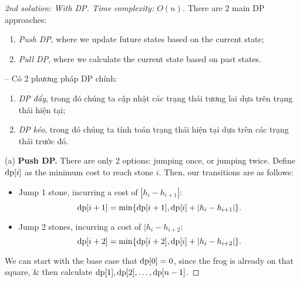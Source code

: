 \documentclass{article}
\begin{document}
\begin{proof}[2nd solution: With DP. Time complexity: $O(n)$]
    There are 2 main DP approaches:
    \begin{enumerate}
        \item {\it Push DP}, where we update future states based on the current state;
        \item {\it Pull DP}, where we calculate the current state based on past states.
    \end{enumerate}
    -- Có 2 phương pháp DP chính:
    \begin{enumerate}
        \item {\it DP đẩy}, trong đó chúng ta cập nhật các trạng thái tương lai dựa trên trạng thái hiện tại;
        \item {\it DP kéo}, trong đó chúng ta tính toán trạng thái hiện tại dựa trên các trạng thái trước đó.
    \end{enumerate}
    \item(a) {\bf Push DP.} There are only 2 options: jumping once, or jumping twice. Define ${\rm dp}[i]$ as the minimum cost to reach stone $i$. Then, our transitions are as follows:
    \begin{itemize}
        \item Jump 1 stone, incurring a cost of $|h_i - h_{i+1}|$:
        \begin{equation*}
            {\rm dp}[i + 1] = \min\{{\rm dp}[i + 1],{\rm dp}[i] + |h_i - h_{i+1}|\}.
        \end{equation*}
        \item Jump 2 stones, incurring a cost of $|h_i - h_{i+2}$:
        \begin{equation*}
            {\rm dp}[i + 2] = \min\{{\rm dp}[i + 2],{\rm dp}[i] + |h_i - h_{i+2}|\}.
        \end{equation*}
    \end{itemize}
    We can start with the base case that ${\rm dp}[0] = 0$, since the frog is already on that square, \& then calculate ${\rm dp}[1],{\rm dp}[2],\ldots,{\rm dp}[n - 1]$.


\end{proof}
\end{document}
